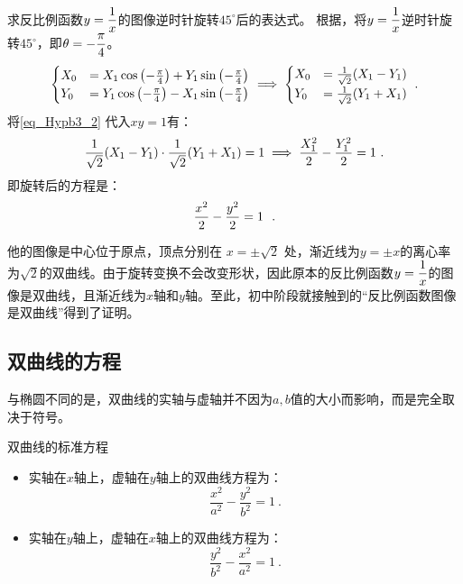 \begin{example}{求反比例函数$\displaystyle y={1\over x}$的图像逆时针旋转$45^\circ$后的表达式。}
根据，将$\displaystyle y={1\over x}$逆时针旋转$45^\circ$，即$\displaystyle\theta=-{\pi\over4}$。
\begin{equation}\label{eq_Hypb3_2}
\begin{cases}
\displaystyle
X_0&=X_1 \cos \left(-{\pi\over4}\right) + Y_1 \sin \left(-{\pi\over4}\right)\\
Y_0&=Y_1 \cos \left(-{\pi\over4}\right) - X_1 \sin \left(-{\pi\over4}\right)\\
\end{cases}\implies
\begin{cases}
X_0&={1\over\sqrt{2}}(X_1 - Y_1)\\
Y_0&={1\over\sqrt{2}}(Y_1+ X_1) \\
\end{cases}~.
\end{equation}
将\autoref{eq_Hypb3_2} 代入$xy=1$有：
\begin{equation}
\displaystyle
{1\over\sqrt{2}}(X_1 - Y_1)\cdot{1\over\sqrt{2}}(Y_1+ X_1)=1\implies {X_1^2\over2}- {Y_1^2\over2}=1~.
\end{equation}
即旋转后的方程是：
\begin{equation}
{x^2\over2}- {y^2\over2}=1~~.
\end{equation}
\end{example}

他的图像是中心位于原点，顶点分别在 $x = \pm \sqrt{2}$ 处，渐近线为$y = \pm x$的离心率为$\sqrt{2}$的双曲线。由于旋转变换不会改变形状，因此原本的反比例函数$\displaystyle y={1\over x}$的图像是双曲线，且渐近线为$x$轴和$y$轴。至此，初中阶段就接触到的“反比例函数图像是双曲线”得到了证明。

\subsection{双曲线的方程}

与椭圆不同的是，双曲线的实轴与虚轴并不因为$a,b$值的大小而影响，而是完全取决于符号。
\begin{theorem}{双曲线的标准方程}
\begin{itemize}
\item 实轴在$x$轴上，虚轴在$y$轴上的双曲线方程为：
\begin{equation}\label{eq_Hypb3_4}
\frac{x^2}{a^2} - \frac{y^2}{b^2} = 1~.
\end{equation}
\item 实轴在$y$轴上，虚轴在$x$轴上的双曲线方程为：
\begin{equation}
\frac{y^2}{b^2} -\frac{x^2}{a^2}  = 1~.
\end{equation}
\end{itemize}
\end{theorem}

